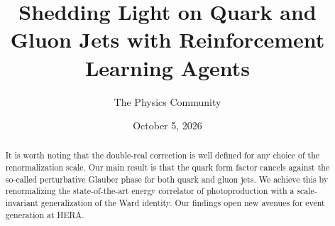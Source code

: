 \documentclass[11pt]{article}
\title{Shedding Light on Quark and Gluon Jets with Reinforcement Learning Agents}
\author{The Physics Community}
\date{October 5, 2026}
\numberwithin{equation}{section}
\theoremstyle{definition}
\theoremstyle{remark}
\begin{document}
\maketitle
\begin{abstract}
It is worth noting that the double-real correction is well defined for
any choice of the renormalization scale. Our main result is that the
quark form factor cancels against the so-called perturbative Glauber
phase for both quark and gluon jets. We achieve this by renormalizing
the state-of-the-art energy correlator of photoproduction with a
scale-invariant generalization of the Ward identity. Our findings open
new avenues for event generation at HERA.
\end{abstract}
\tableofcontents





\nocite{*}


\end{document}
